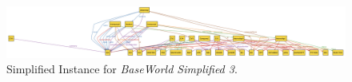 \begin{figure}[H]
    \centering
    \includegraphics[width=1.12\linewidth]{JhaBhatiaSharma/Images/BaseWorld3.png}
    \caption{Simplified Instance for \textit{BaseWorld Simplified 3}.}
    \label{fig:world_magic}
\end{figure}
